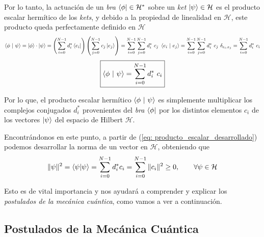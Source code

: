 \documentclass{article}
\numberwithin{equation}{section} %
\begin{document}
    Por lo tanto, la actuación de un \textit{bra} \( \bra{\phi} \in \mathcal{H}^{*} \) sobre un \textit{ket} \( \ket{\psi} \in \mathcal{H} \) es el producto escalar hermítico de los \textit{kets}, y debido a la propiedad de linealidad en \( \mathcal{H} \), este producto queda perfectamente definido en \( \mathcal{H} \)
    \begin{equation*}
        \braket{\phi \ | \ \psi} = \ket{\phi} \cdot \ket{\psi} = \left( \sum_{i = 0}^{N - 1} d_{i}^{*} \bra{e_{i}} \right) \left( \sum_{j = 0}^{N - 1} c_{j} \ket{e_{j}} \right) = \sum_{i = 0}^{N - 1} \sum_{j = 0}^{N - 1} d_{i}^{*} \ c_{j} \ \braket{e_{i} \ | \ e_{j}} = \sum_{i = 0}^{N - 1} \sum_{j = 0}^{N - 1} d_{i}^{*} \ c_{j} \ \delta_{e_{i}, e_{j}} = \sum_{i = 0}^{N - 1} d_{i}^{*} \ c_{i}
    \end{equation*}
    \begin{equation}
        \boxed{\braket{\phi \ | \ \psi} = \sum_{i = 0}^{N - 1} d_{i}^{*} \ c_{i}}
        \label{eq: producto_escalar_desarrollado}
    \end{equation}

    \vspace{1.5mm}

    Por lo que, el producto escalar hermítico \( \braket{\phi \ | \ \psi} \) es simplemente multiplicar los complejos conjugados \( d_{i}^{*} \) provenientes del \textit{bra} \( \bra{\phi} \) por los distintos elementos \( c_{i} \) de los vectores \( \ket{\psi} \) del espacio de Hilbert \( \mathcal{H} \). 

    \vspace{5mm}

    Encontrándonos en este punto, a partir de (\ref{eq: producto_escalar_desarrollado}) podemos desarrollar la norma de un vector en \( \mathcal{H} \), obteniendo que
    \begin{equation}
        \| \psi \| ^{2} = \braket{\psi | \psi} = \sum_{i = 0}^{N - 1} d_{i}^{*} c_{i} = \sum_{i = 0}^{N - 1} \| c_{i} \| ^{2} \geq 0, \qquad \forall \psi \in \mathcal{H}
    \end{equation}

    \vspace{2mm}

    Esto es de vital importancia y nos ayudará a comprender y explicar los \textit{postulados de la mecánica cuántica}, como vamos a ver a continuación.


    \vspace{5mm}

    \subsection{Postulados de la Mecánica Cuántica}\label{sec: postulados}
\end{document}
